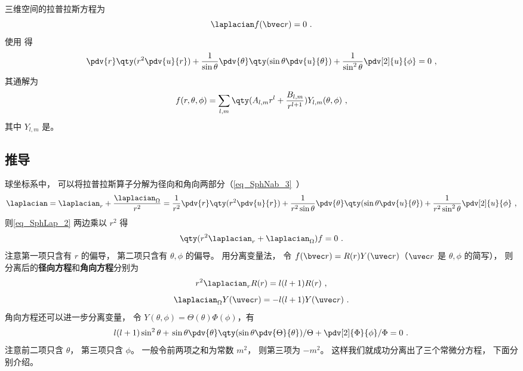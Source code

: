 

三维空间的拉普拉斯方程为
\begin{equation}\label{eq_SphLap_2}
\laplacian f(\bvec r) = 0~.
\end{equation}
使用 得
\begin{equation}
\pdv{r} \qty(r^2 \pdv{u}{r}) + \frac{1}{\sin\theta}\pdv{\theta} \qty(\sin \theta \pdv{u}{\theta}) + \frac{1}{\sin^2 \theta} \pdv[2]{u}{\phi} = 0~,
\end{equation}
其通解为
\begin{equation}\label{eq_SphLap_7}
f(r, \theta, \phi) = \sum_{l,m} \qty(A_{l,m} r^l + \frac{B_{l,m}}{r^{l+1}}) Y_{l,m} (\theta, \phi)~,
\end{equation}
其中 $Y_{l,m}$ 是。

\subsection{推导}
球坐标系中， 可以将拉普拉斯算子分解为径向和角向两部分（\autoref{eq_SphNab_3}~）
\begin{equation}\label{eq_SphLap_5}
\laplacian = \laplacian_r + \frac{\laplacian_{\Omega}}{r^2} = \frac{1}{r^2} \pdv{r} \qty(r^2 \pdv{u}{r}) + \frac{1}{r^2\sin\theta}\pdv{\theta} \qty(\sin \theta \pdv{u}{\theta}) + \frac{1}{r^2\sin^2 \theta} \pdv[2]{u}{\phi}~,
\end{equation}
则\autoref{eq_SphLap_2} 两边乘以 $r^2$ 得
\begin{equation}
\qty(r^2\laplacian_r + \laplacian_\Omega) f = 0~.
\end{equation}
注意第一项只含有 $r$ 的偏导， 第二项只含有 $\theta,\phi$ 的偏导。 用分离变量法， 令 $f(\bvec r) = R(r) Y(\uvec r)$（$\uvec r$ 是 $\theta, \phi$ 的简写）， 则分离后的\textbf{径向方程}和\textbf{角向方程}分别为
\begin{equation}\label{eq_SphLap_4}
r^2\laplacian_r R(r) = l(l+1)R(r)~,
\end{equation}
\begin{equation}\label{eq_SphLap_1}
\laplacian_{\Omega} Y(\uvec r) = -l(l+1) Y(\uvec r)~.
\end{equation}
角向方程还可以进一步分离变量， 令 $Y(\theta,\phi) = \Theta(\theta)\Phi(\phi)$，有
\begin{equation}\label{eq_SphLap_3}
l(l+1)\sin^2 \theta + \left. \sin\theta\pdv{\theta} \qty(\sin \theta \pdv{\Theta}{\theta}) \middle/ \Theta + \pdv[2]{\Phi}{\phi} \middle/ \Phi = 0~. \right.
\end{equation}
注意前二项只含 $\theta$， 第三项只含 $\phi$。 一般令前两项之和为常数 $m^2$， 则第三项为 $-m^2$。 这样我们就成功分离出了三个常微分方程， 下面分别介绍。

